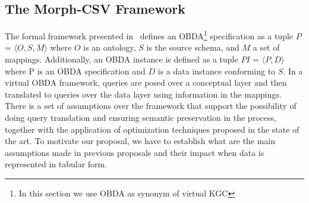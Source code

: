 \subsection{The Morph-CSV Framework}

The formal framework presented in~\citep{xiao2018obdasurvey} defines an OBDA\footnote{In this section we use OBDA as synonym of virtual KGC} specification as a tuple $P$ = $\langle O,S,M\rangle$ where $O$ is an ontology, $S$ is the source schema, and $M$ a set of mappings. Additionally, an OBDA instance is defined as a tuple $PI$ = $\langle P,D\rangle$ where P is an OBDA specification and $D$ is a data instance conforming to $S$. In a virtual OBDA framework, queries are posed over a conceptual layer and then translated to queries over the data layer using information in the mappings. There is a set of assumptions over the framework that support the possibility of doing query translation and  ensuring  semantic preservation in the process, together with the application of  optimization techniques proposed in the state of the art. To motivate our proposal, we have to establish what are the main assumptions made in previous proposals and their impact when data is represented in tabular form.


